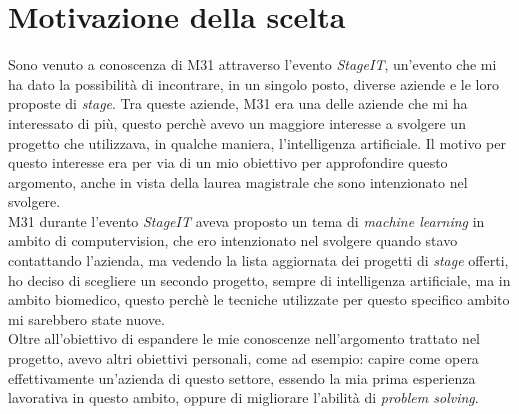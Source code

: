 \section{Motivazione della scelta}\label{sec:choice-motivation}\noindent
Sono venuto a conoscenza di M31 attraverso l'evento \textit{StageIT}, un'evento che mi ha dato la possibilità di incontrare, in un singolo posto, diverse aziende e le loro proposte di \textit{stage}.
Tra queste aziende, M31 era una delle aziende che mi ha interessato di più, questo perchè avevo un maggiore interesse a svolgere un progetto che utilizzava, in qualche maniera, l'intelligenza artificiale.
Il motivo per questo interesse era per via di un mio obiettivo per approfondire questo argomento, anche in vista della laurea magistrale che sono intenzionato nel svolgere.\\
M31 durante l'evento \textit{StageIT} aveva proposto un tema di \textit{machine learning} in ambito di \gls{computervision}, che ero intenzionato nel svolgere quando stavo contattando l'azienda, ma vedendo la lista aggiornata dei progetti di \textit{stage} offerti, ho deciso di scegliere un secondo progetto, sempre di intelligenza artificiale, ma in ambito biomedico, questo perchè le tecniche utilizzate per questo specifico ambito mi sarebbero state nuove.\\
Oltre all'obiettivo di espandere le mie conoscenze nell'argomento trattato nel progetto, avevo altri obiettivi personali, come ad esempio: capire come opera effettivamente un'azienda di questo settore, essendo la mia prima esperienza lavorativa in questo ambito, oppure di migliorare l'abilità di \textit{problem solving}.